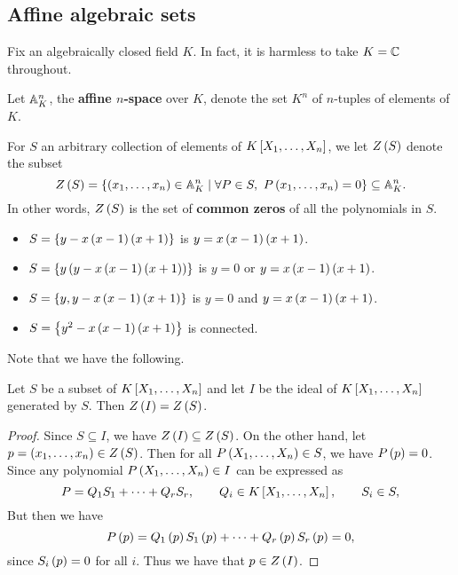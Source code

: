 \subsection{Affine algebraic sets}

Fix an algebraically closed field $ K $. In fact, it is harmless to take $ K = \C $ throughout.

\begin{definition}
Let $ \A_K^n $, the \textbf{affine $ n $-space} over $ K $, denote the set $ K^n $ of $ n $-tuples of elements of $ K $.
\end{definition}

For $ S $ an arbitrary collection of elements of $ K\sb{X_1, \dots, X_n} $, we let $ Z\rb{S} $ denote the subset
$$ Z\rb{S} = \cb{\rb{x_1, \dots, x_n} \in \A_K^n \mid \forall P \in S, \ P\rb{x_1, \dots, x_n} = 0} \subseteq \A_K^n. $$
In other words, $ Z\rb{S} $ is the set of \textbf{common zeros} of all the polynomials in $ S $.

\begin{example*}
\hfill
\begin{itemize}
\item $ S = \cb{y - x\rb{x - 1}\rb{x + 1}} $ is $ y = x\rb{x - 1}\rb{x + 1} $.
\item $ S = \cb{y\rb{y - x\rb{x - 1}\rb{x + 1}}} $ is $ y = 0 $ or $ y = x\rb{x - 1}\rb{x + 1} $.
\item $ S = \cb{y, y - x\rb{x - 1}\rb{x + 1}} $ is $ y = 0 $ and $ y = x\rb{x - 1}\rb{x + 1} $.
\item $ S = \cb{y^2 - x\rb{x - 1}\rb{x + 1}} $ is connected.
\end{itemize}
\end{example*}

\pagebreak

Note that we have the following.

\begin{lemma}
Let $ S $ be a subset of $ K\sb{X_1, \dots, X_n} $ and let $ I $ be the ideal of $ K\sb{X_1, \dots, X_n} $ generated by $ S $. Then $ Z\rb{I} = Z\rb{S} $.
\end{lemma}

\begin{proof}
Since $ S \subseteq I $, we have $ Z\rb{I} \subseteq Z\rb{S} $. On the other hand, let $ p = \rb{x_1, \dots, x_n} \in Z\rb{S} $. Then for all $ P\rb{X_1, \dots, X_n} \in S $, we have $ P\rb{p} = 0 $. Since any polynomial $ P\rb{X_1, \dots, X_n} \in I $ can be expressed as
$$ P = Q_1S_1 + \dots + Q_rS_r, \qquad Q_i \in K\sb{X_1, \dots, X_n}, \qquad S_i \in S, $$
But then we have
$$ P\rb{p} = Q_1\rb{p}S_1\rb{p} + \dots + Q_r\rb{p}S_r\rb{p} = 0, $$
since $ S_i\rb{p} = 0 $ for all $ i $. Thus we have that $ p \in Z\rb{I} $.
\end{proof}

